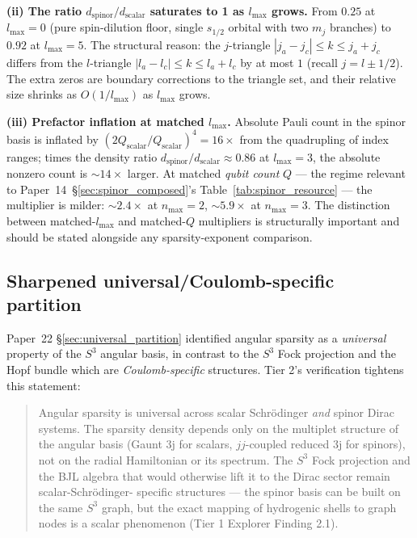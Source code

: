 \documentclass[twocolumn,pra,amsmath,amssymb,superscriptaddress]{revtex4-2}
\begin{document}
\textbf{(ii) The ratio $d_{\mathrm{spinor}}/d_{\mathrm{scalar}}$ saturates to 1 as $l_{\max}$ grows.}
From $0.25$ at $l_{\max}=0$ (pure spin-dilution floor, single
$s_{1/2}$ orbital with two $m_j$ branches) to $0.92$ at $l_{\max}=5$.
The structural reason: the $j$-triangle
$|j_a - j_c| \leq k \leq j_a + j_c$ differs from the $l$-triangle
$|l_a - l_c| \leq k \leq l_a + l_c$ by at most $1$ (recall
$j = l \pm 1/2$). The extra zeros are boundary corrections to the
triangle set, and their relative size shrinks as $O(1/l_{\max})$ as
$l_{\max}$ grows.

\textbf{(iii) Prefactor inflation at matched $l_{\max}$.}
Absolute Pauli count in the spinor basis is inflated by
$(2Q_{\mathrm{scalar}}/Q_{\mathrm{scalar}})^4 = 16\times$ from the
quadrupling of index ranges; times the density ratio
$d_{\mathrm{spinor}}/d_{\mathrm{scalar}} \approx 0.86$ at $l_{\max}=3$,
the absolute nonzero count is $\sim 14\times$ larger. At matched
\emph{qubit count} $Q$ --- the regime relevant to
Paper~14~\S\ref{sec:spinor_composed}'s
Table~\ref{tab:spinor_resource} --- the multiplier is milder:
$\sim 2.4\times$ at $n_{\max}=2$, $\sim 5.9\times$ at $n_{\max}=3$.
The distinction between matched-$l_{\max}$ and matched-$Q$
multipliers is structurally important and should be stated
alongside any sparsity-exponent comparison.

\subsection{Sharpened universal/Coulomb-specific partition}

Paper~22 \S\ref{sec:universal_partition} identified angular sparsity
as a \emph{universal} property of the $S^3$ angular basis, in contrast
to the $S^3$ Fock projection and the Hopf bundle which are
\emph{Coulomb-specific} structures. Tier 2's verification tightens
this statement:

\begin{quote}
Angular sparsity is universal across scalar Schr\"odinger \emph{and}
spinor Dirac systems. The sparsity density depends only on the
multiplet structure of the angular basis (Gaunt 3j for scalars,
$jj$-coupled reduced 3j for spinors), not on the radial Hamiltonian
or its spectrum. The $S^3$ Fock projection and the BJL algebra that
would otherwise lift it to the Dirac sector remain scalar-Schr\"odinger-
specific structures --- the spinor basis can be built on the same
$S^3$ graph, but the exact mapping of hydrogenic shells to graph
nodes is a scalar phenomenon (Tier 1 Explorer Finding 2.1).
\end{quote}
\end{document}
